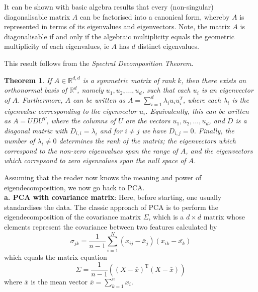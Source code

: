 \documentclass[journal, a4paper]{IEEEtran}
\newtheorem{theorem}{Theorem}[section]
\begin{document}
It can be shown with basic algebra results that every (non-singular) diagonalisable matrix \( A \) can be factorised into a canonical form, whereby \( A \) is represented in terms of its eigenvalues and eigenvectors.
Note, the matrix \( A \) is diagonalisable if and only if the algebraic multiplicity equals the geometric multiplicity of each eigenvalues, ie \( A \) has \( d \) distinct eigenvalues.

This result follows from the \textit{Spectral Decomposition Theorem}. 
\begin{theorem}\label{spectralthm}
	If \( A \in \mathbb{R}^{d,d}\) is a symmetric matrix of rank \( k \), then there exists an orthonormal basis of \( \mathbb{R}^d \), namely \( u_{1}, u_{2}, ..., u_{d} \), such that each \( u_{i} \) is an eigenvector of \( A \). Furthermore, \( A \) can be written as \( A = \sum_{i=1}^{d} \lambda_{i} u_{i} u_{i}^T \), where each \( \lambda_{i} \) is the eigenvalue corresponding to the eigenvector \( u_{i} \). Equivalently, this can be written as \( A = U D U^T \), where the columns of \( U \) are the vectors \( u_{1}, u_{2}, ..., u_{d} \), and \( D \) is a diagonal matrix with \( D_{i,i} = \lambda_{i} \) and for \( i \neq j \) we have \( D_{i,j} = 0 \). Finally, the number of \( \lambda_{i} \neq 0 \) determines the rank of the matrix; the eigenvectors which correspond to the non-zero eigenvalues span the range of \( A \), and the eigenvectors which correpsond to zero eigenvalues span the null space of \( A \).
\end{theorem}

Assuming that the reader now knows the meaning and power of eigendecomposition, we now go back to PCA.\\
\textbf{a. PCA with covariance matrix}:
Here, before starting, one usually standardises the data. %
The classic approach of PCA is to perform the eigendecomposition of the covariance matrix \( \Sigma \), which is a \( d \times d \) matrix whose elements represent the covariance between two features calculated by 
\[
\sigma_{jk} = \frac{1}{n-1} \sum_{i=1}^{N} (x_{ij} - \bar{x}_{j}) (x_{ik} - \bar{x_{k}})
\]
which equals the matrix equation
\[
\Sigma = \frac{1}{n-1} ( (X - \bar{x})^{\text{T}} (X - \bar{x}) )
\]
where \( \bar{x }\) is the mean vector \( \bar{x}= \sum_{k=1}^{n} x_{i}  \).
\end{document}
